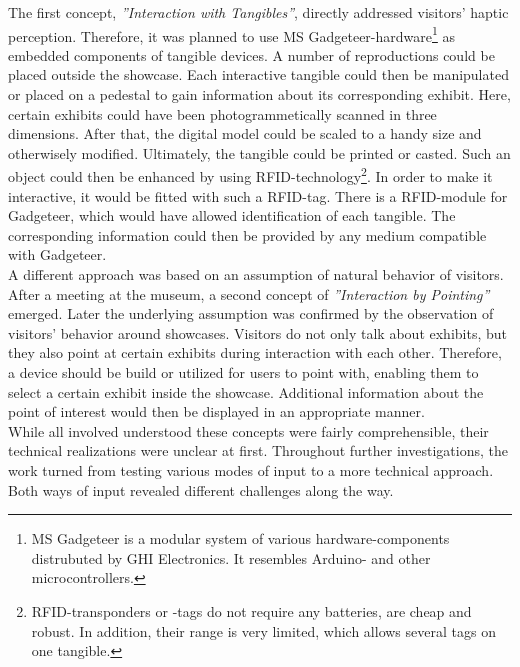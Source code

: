 The first concept, \textit{''Interaction with Tangibles''}, directly addressed visitors' haptic perception. Therefore, it was planned to use \ac{MS} Gadgeteer-hardware\footnote{\ac{MS} Gadgeteer is a modular system of various hardware-components distrubuted by GHI Electronics. It resembles Arduino- and other microcontrollers.} as embedded components of tangible devices. A number of reproductions could be placed outside the showcase. Each interactive tangible could then be manipulated or placed on a pedestal to gain information about its corresponding exhibit. Here, certain exhibits could have been photogrammetically scanned in three dimensions. After that, the digital model could be scaled to a handy size and otherwisely modified. Ultimately, the tangible could be printed or casted. Such an object could then be enhanced by using \ac{RFID}-technology\footnote{RFID-transponders or -tags do not require any batteries, are cheap and robust. In addition, their range is very limited, which allows several tags on one tangible.}. In order to make it interactive, it would be fitted with such a \ac{RFID}-tag. There is a \ac{RFID}-module for Gadgeteer, which would have allowed identification of each tangible. The corresponding information could then be provided by any medium compatible with Gadgeteer.
\\
A different approach was based on an assumption of natural behavior of visitors. After a meeting at the museum, a second concept of \textit{''Interaction by Pointing''} emerged. Later the underlying assumption was confirmed by the observation of visitors' behavior around showcases. Visitors do not only talk about exhibits, but they also point at certain exhibits during interaction with each other. Therefore, a device should be build or utilized for users to point with, enabling them to select a certain exhibit inside the showcase. Additional information about the point of interest would then be displayed in an appropriate manner. 
\\
While all involved understood these concepts were fairly comprehensible, their technical realizations were unclear at first. Throughout further investigations, the work turned from testing various modes of input to a more technical approach. Both ways of input revealed different challenges along the way.



